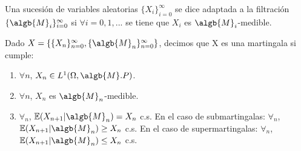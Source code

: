 \documentclass{apuntes}
\begin{document}
\begin{defn}
Una sucesión de variables aleatorias $\{X_i\}_{i=0}^{\infty}$ se dice adaptada a la filtración $\{\algb{M}_i\}_{i=0}^{\infty}$ si $\forall i = 0,1,...$ se tiene que $X_i$ es $\algb{M}_i$-medible.
\end{defn}

\begin{defn}[Martingala]
Dado $X=\{\{X_n\}_{n=0}^{\infty}, \{\algb{M}_n\}_{n=0}^{\infty}\}$, decimos que X es una martingala si cumple:
\begin{enumerate}
\item $\forall n$, $X_n \in L^1(\Omega, \algb{M}. P)$.
\item $\forall n$, $X_n$ es $\algb{M}_n$-medible.
\item $\forall_n$, $\mathbb{E}(X_{n+1}|\algb{M}_n)=X_n$ c.s.
En el caso de submartingalas: $\forall_n$, $\mathbb{E}(X_{n+1}|\algb{M}_n)\geq X_n$ c.s.
En el caso de supermartingalas: $\forall_n$, $\mathbb{E}(X_{n+1}|\algb{M}_n)\leq X_n$ c.s.
\end{enumerate}
\end{defn}
\end{document}
